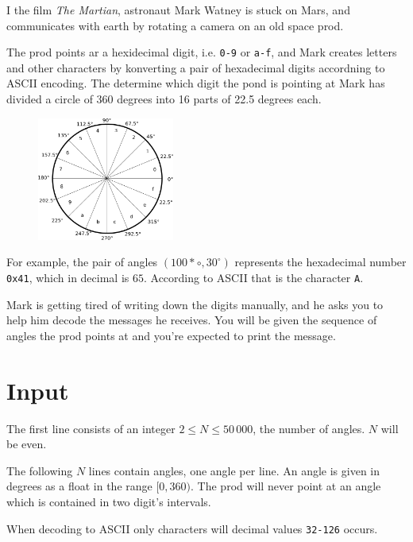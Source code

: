 
I the film \emph{The Martian}, astronaut Mark Watney is stuck on Mars, and communicates with earth by rotating a camera on an old space prod.

The prod points ar a hexidecimal digit, i.e. \texttt{0-9} or \texttt{a-f}, and Mark creates letters and other characters by konverting a pair
of hexadecimal digits accordning to ASCII encoding. The determine which digit the pond is pointing at Mark has divided a circle of 360 degrees into 16 parts of 22.5 degrees each.

\begin{figure}[h!]
  \begin{center}
    \includegraphics[width=0.4\textwidth]{angles.png}
  \end{center}
\end{figure}

For example, the pair of angles $(100*{\circ}, 30^{\circ})$ represents the hexadecimal number \texttt{0x41}, which in decimal is $65$.
According to ASCII that is the character \texttt{A}.

Mark is getting tired of writing down the digits manually, and he asks you to help him decode the messages he receives. You will be given the sequence of angles the prod points at and you're expected to print the message.

\section*{Input}
The first line consists of an integer $2 \le N \le 50\,000$, the number of angles. $N$ will be even.

The following $N$ lines contain angles, one angle per line. An angle is given in degrees as a float in the range $[0, 360)$.
The prod will never point at an angle which is contained in two digit's intervals.

When decoding to ASCII only characters will decimal values \texttt{32-126} occurs.

